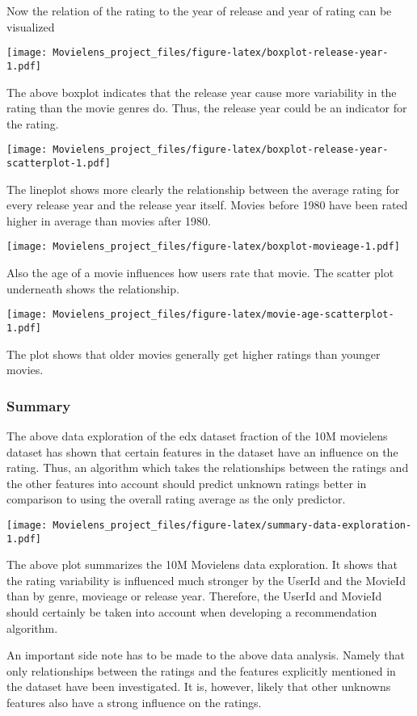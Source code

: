 \documentclass[
]{article}
\begin{document}
Now the relation of the rating to the year of release and year of rating
can be visualized

\texttt{[image: Movielens\_project\_files/figure-latex/boxplot-release-year-1.pdf]}

The above boxplot indicates that the release year cause more variability
in the rating than the movie genres do. Thus, the release year could be
an indicator for the rating.

\texttt{[image: Movielens\_project\_files/figure-latex/boxplot-release-year-scatterplot-1.pdf]}

The lineplot shows more clearly the relationship between the average
rating for every release year and the release year itself. Movies before
1980 have been rated higher in average than movies after 1980.

\texttt{[image: Movielens\_project\_files/figure-latex/boxplot-movieage-1.pdf]}

Also the age of a movie influences how users rate that movie. The
scatter plot underneath shows the relationship.

\texttt{[image: Movielens\_project\_files/figure-latex/movie-age-scatterplot-1.pdf]}

The plot shows that older movies generally get higher ratings than
younger movies.

\hypertarget{summary}{%
\subsubsection{Summary}\label{summary}}

The above data exploration of the edx dataset fraction of the 10M
movielens dataset has shown that certain features in the dataset have an
influence on the rating. Thus, an algorithm which takes the
relationships between the ratings and the other features into account
should predict unknown ratings better in comparison to using the overall
rating average as the only predictor.

\texttt{[image: Movielens\_project\_files/figure-latex/summary-data-exploration-1.pdf]}

The above plot summarizes the 10M Movielens data exploration. It shows
that the rating variability is influenced much stronger by the UserId
and the MovieId than by genre, movieage or release year. Therefore, the
UserId and MovieId should certainly be taken into account when
developing a recommendation algorithm.

An important side note has to be made to the above data analysis. Namely
that only relationships between the ratings and the features explicitly
mentioned in the dataset have been investigated. It is, however, likely
that other unknowns features also have a strong influence on the
ratings.
\end{document}

